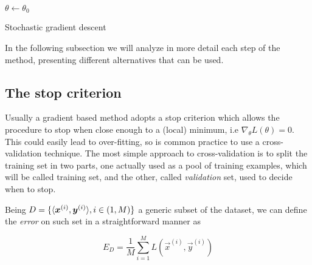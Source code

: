 \begin{algorithm}[]
  
 \BlankLine
 
 $\theta \gets \theta_0$\\
\caption{Stochastic gradient descent}
\label{algo:sgd}
\end{algorithm}

In the following subsection we will analyze in more detail each step of the method, presenting different alternatives 
that can be used.

\subsection{The stop criterion}

Usually a gradient based method adopts a stop criterion which allows the procedure to stop when close enough to a (local) 
minimum, i.e $\nabla_\theta L(\theta)=0$.  This could easily lead to over-fitting, so is common practice to use a 
cross-validation technique. The most simple approach to cross-validation is to split the training set in two parts, one actually used as a pool of training examples, which will be called training set, and the other, called \textit{validation} set, used to decide when to stop.

Being $D=\{\langle\boldsymbol{x}^{(i)},\boldsymbol{y}^{(i)}\rangle, i\in(1,M)\}$ a generic subset of the dataset, we can define the \textit{error} on such set in a straightforward manner as 

\begin{equation}
 E_D = \frac{1}{M} \sum_{i=1}^M  L(\vec{x}^{(i)},\vec{y}^{(i)})
\end{equation}

